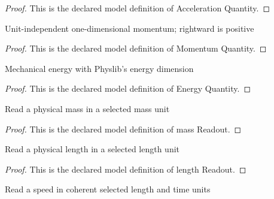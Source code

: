 \begin{proof}
  This is the declared model definition of Acceleration Quantity.
\end{proof}
\begin{definition}
  \label{def:physics:phyx-mini-0764:phyxminiproblems-problemphyxmini0764-momentumquantity}
  Unit-independent one-dimensional momentum; rightward is positive
\end{definition}
\begin{proof}
  This is the declared model definition of Momentum Quantity.
\end{proof}
\begin{definition}
  \label{def:physics:phyx-mini-0764:phyxminiproblems-problemphyxmini0764-energyquantity}
  Mechanical energy with Physlib's energy dimension
\end{definition}
\begin{proof}
  This is the declared model definition of Energy Quantity.
\end{proof}
\begin{definition}
  \label{def:physics:phyx-mini-0764:phyxminiproblems-problemphyxmini0764-massreadout}
  Read a physical mass in a selected mass unit
\end{definition}
\begin{proof}
  This is the declared model definition of mass Readout.
\end{proof}
\begin{definition}
  \label{def:physics:phyx-mini-0764:phyxminiproblems-problemphyxmini0764-lengthreadout}
  Read a physical length in a selected length unit
\end{definition}
\begin{proof}
  This is the declared model definition of length Readout.
\end{proof}
\begin{definition}
  \label{def:physics:phyx-mini-0764:phyxminiproblems-problemphyxmini0764-speedreadout}
  Read a speed in coherent selected length and time units
\end{definition}
